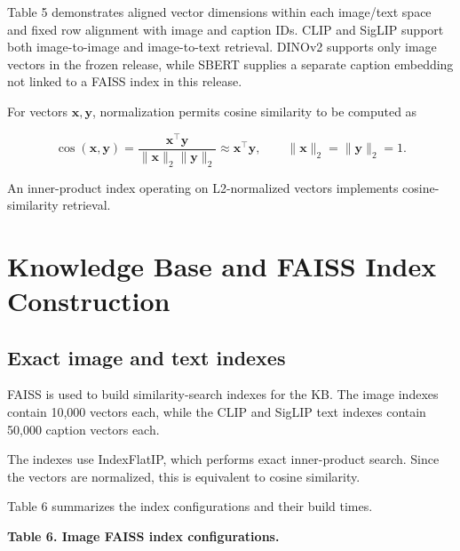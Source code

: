 \documentclass{article}
\begin{document}
Table 5 demonstrates aligned vector dimensions within each image/text
space and fixed row alignment with image and caption IDs. CLIP and
SigLIP support both image-to-image and image-to-text retrieval. DINOv2
supports only image vectors in the frozen release, while SBERT supplies
a separate caption embedding not linked to a FAISS index in this
release.

For vectors \(\mathbf x,\mathbf y\), normalization permits cosine
similarity to be computed as

\begin{equation*}
\cos(\mathbf{x},\mathbf{y})
=\frac{\mathbf{x}^{\top}\mathbf{y}}
       {\|\mathbf{x}\|_{2}\|\mathbf{y}\|_{2}}
\approx \mathbf{x}^{\top}\mathbf{y},
\qquad \|\mathbf{x}\|_{2}=\|\mathbf{y}\|_{2}=1.
\end{equation*}

An inner-product index operating on L2-normalized vectors implements cosine-similarity retrieval.

\section{Knowledge Base and FAISS Index
Construction}\label{knowledge-base-and-faiss-index-construction}

\subsection{Exact image and text
indexes}\label{exact-image-and-text-indexes}

FAISS \cite{johnson_billion-scale_2021} is used to build similarity-search indexes for the KB.
The image indexes contain 10,000 vectors each, while the CLIP and
SigLIP text indexes contain 50,000 caption vectors each.

The indexes use IndexFlatIP, which performs exact inner-product
search. Since the vectors are normalized, this is equivalent to
cosine similarity. 

Table 6 summarizes the index configurations
and their build times.

\begin{center}
\textbf{Table 6. Image FAISS index configurations.}
\end{center}
\label{tab:indexes}

\begin{table}[htbp]
\centering
{}
\end{table}
\end{document}
